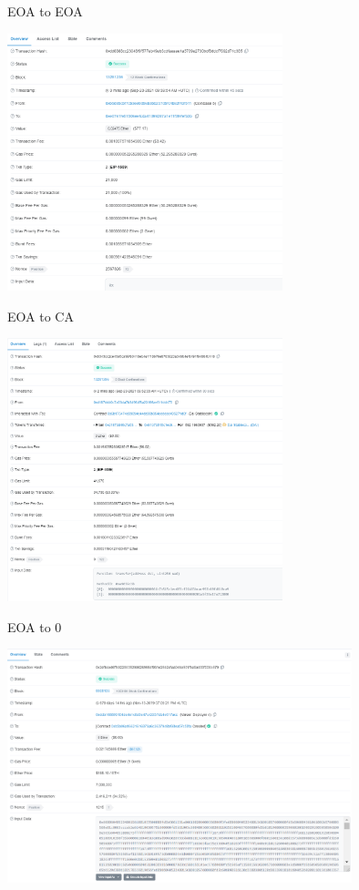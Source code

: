 \documentclass[handout]{beamer}
\begin{document}
\begin{frame}{EOA to EOA}

\center
	\includegraphics[width=8cm]{../assets/images/EOA_to_EOA}

\end{frame}

\begin{frame}{EOA to CA}

\center
	\includegraphics[width=8cm]{../assets/images/EOA_to_CA}

\end{frame}

\begin{frame}{EOA to 0}

\center
	\includegraphics[width=10cm]{../assets/images/EOA_to_0}

\end{frame}
\end{document}
